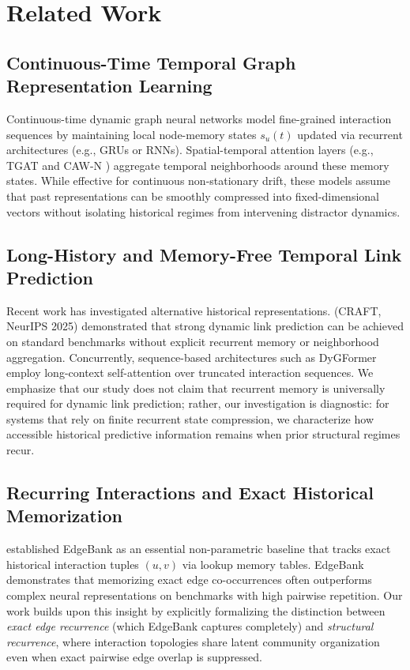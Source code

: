 \section{Related Work}
\label{sec:related_work}

\subsection{Continuous-Time Temporal Graph Representation Learning}
Continuous-time dynamic graph neural networks \citep{rossi2020temporal, trivedi2019dyrep, kumar2019predicting, kazemi2020representation} model fine-grained interaction sequences by maintaining local node-memory states $s_u(t)$ updated via recurrent architectures (e.g., GRUs or RNNs). Spatial-temporal attention layers (e.g., TGAT \citep{xu2020inductive} and CAW-N \citep{wang2021inductive}) aggregate temporal neighborhoods around these memory states. While effective for continuous non-stationary drift, these models assume that past representations can be smoothly compressed into fixed-dimensional vectors without isolating historical regimes from intervening distractor dynamics.

\subsection{Long-History and Memory-Free Temporal Link Prediction}
Recent work has investigated alternative historical representations. \citet{sankar2023craft} (CRAFT, NeurIPS 2025) demonstrated that strong dynamic link prediction can be achieved on standard benchmarks without explicit recurrent memory or neighborhood aggregation. Concurrently, sequence-based architectures such as DyGFormer \citep{kazemi2020representation} employ long-context self-attention over truncated interaction sequences. We emphasize that our study does not claim that recurrent memory is universally required for dynamic link prediction; rather, our investigation is diagnostic: for systems that rely on finite recurrent state compression, we characterize how accessible historical predictive information remains when prior structural regimes recur.

\subsection{Recurring Interactions and Exact Historical Memorization}
\citet{poursafaei2022towards} established EdgeBank as an essential non-parametric baseline that tracks exact historical interaction tuples $(u, v)$ via lookup memory tables. EdgeBank demonstrates that memorizing exact edge co-occurrences often outperforms complex neural representations on benchmarks with high pairwise repetition. Our work builds upon this insight by explicitly formalizing the distinction between \textit{exact edge recurrence} (which EdgeBank captures completely) and \textit{structural recurrence}, where interaction topologies share latent community organization even when exact pairwise edge overlap is suppressed.

